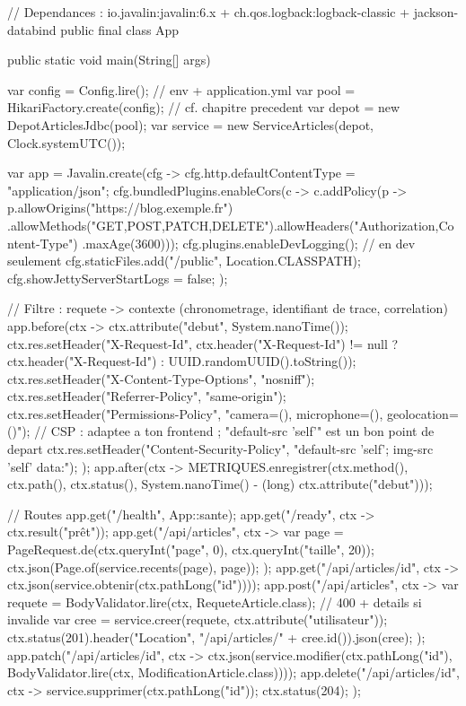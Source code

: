 \documentclass[12pt,a4paper,twoside,openright]{book}
\begin{document}
\begin{codejava}
// Dependances : io.javalin:javalin:6.x + ch.qos.logback:logback-classic + jackson-databind
public final class App {
    public static void main(String[] args) {
        var config = Config.lire();                          // env + application.yml
        var pool = HikariFactory.create(config);              // cf. chapitre precedent
        var depot = new DepotArticlesJdbc(pool);
        var service = new ServiceArticles(depot, Clock.systemUTC());

        var app = Javalin.create(cfg -> {
            cfg.http.defaultContentType = "application/json";
            cfg.bundledPlugins.enableCors(c -> c.addPolicy(p -> p.allowOrigins("https://blog.exemple.fr")
                    .allowMethods("GET,POST,PATCH,DELETE").allowHeaders("Authorization,Content-Type")
                    .maxAge(3600)));
            cfg.plugins.enableDevLogging();                   // en dev seulement
            cfg.staticFiles.add("/public", Location.CLASSPATH);
            cfg.showJettyServerStartLogs = false;
        });

        // Filtre : requete -> contexte (chronometrage, identifiant de trace, correlation)
        app.before(ctx -> {
            ctx.attribute("debut", System.nanoTime());
            ctx.res.setHeader("X-Request-Id", ctx.header("X-Request-Id") != null
                    ? ctx.header("X-Request-Id") : UUID.randomUUID().toString());
            ctx.res.setHeader("X-Content-Type-Options", "nosniff");
            ctx.res.setHeader("Referrer-Policy", "same-origin");
            ctx.res.setHeader("Permissions-Policy", "camera=(), microphone=(), geolocation=()");
            // CSP : adaptee a ton frontend ; "default-src 'self'" est un bon point de depart
            ctx.res.setHeader("Content-Security-Policy", "default-src 'self'; img-src 'self' data:");
        });
        app.after(ctx -> METRIQUES.enregistrer(ctx.method(), ctx.path(), ctx.status(),
                System.nanoTime() - (long) ctx.attribute("debut")));

        // Routes
        app.get("/health", App::sante);
        app.get("/ready", ctx -> ctx.result("pr\^et"));
        app.get("/api/articles", ctx -> {
            var page = PageRequest.de(ctx.queryInt("page", 0), ctx.queryInt("taille", 20));
            ctx.json(Page.of(service.recents(page), page));
        });
        app.get("/api/articles/{id}", ctx -> ctx.json(service.obtenir(ctx.pathLong("id"))));
        app.post("/api/articles", ctx -> {
            var requete = BodyValidator.lire(ctx, RequeteArticle.class);      // 400 + details si invalide
            var cree = service.creer(requete, ctx.attribute("utilisateur"));
            ctx.status(201).header("Location", "/api/articles/" + cree.id()).json(cree);
        });
        app.patch("/api/articles/{id}", ctx -> ctx.json(service.modifier(ctx.pathLong("id"),
                BodyValidator.lire(ctx, ModificationArticle.class))));
        app.delete("/api/articles/{id}", ctx -> { service.supprimer(ctx.pathLong("id")); ctx.status(204); });

}}
\end{codejava}
\end{document}
